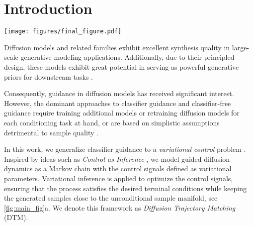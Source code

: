 \section{Introduction}
\label{sec:intro}

\begin{figure*}[!ht]
    \centering
    \texttt{[image: figures/final\_figure.pdf]}
    \caption{\textbf{Our method guides diffusion sampling to fulfill external constraints.} To this end, we optimize the local direction~$\rvu_t^*$ via external constraints while respecting the original trajectory, see \cref{eq:dtm_cost_final} (left, center). This recovers more accurate reconstructions accross tasks compared to classical guidance methods: Nonlinear deblurring (Right). Our method accurately captures most details, while competing methods introduce artifacts in the generated reconstructions.}
    \label{fig:main_fig}
\end{figure*}
Diffusion models \citep{sohl2015deep, ho2020denoising, songscore} and related families \citep{lipman2023flow, albergo2023building, liu2023flow} exhibit excellent synthesis quality in large-scale generative modeling applications. Additionally, due to their principled design, these models exhibit great potential in serving as powerful generative priors for downstream tasks \citep{daras2024surveydiffusionmodelsinverse}.

Consequently, guidance in diffusion models has received significant interest.
However, the dominant approaches to classifier guidance \citep{dhariwal2021diffusion} and classifier-free guidance \citep{ho2022classifier} require training additional models or retraining diffusion models for each conditioning task at hand, or are based on simplistic assumptions detrimental to sample quality \citep{kawar2022denoising, chung2022diffusion, song2022pseudoinverse, pandey2024fast}.


In this work, we generalize classifier guidance to a \emph{variational control} problem \citep{kappen2008stochastic}. Inspired by ideas such as  \emph{Control as Inference} \citep{Kappen_2012, levine2018reinforcementlearningcontrolprobabilistic}, we model guided diffusion dynamics as a Markov chain with the control signals defined as variational parameters. Variational inference is applied to optimize the control signals, ensuring that the process satisfies the desired terminal conditions while keeping the generated samples close to the unconditional sample manifold, see \cref{fig:main_fig}a. We denote this framework as \emph{Diffusion Trajectory Matching} (DTM).



